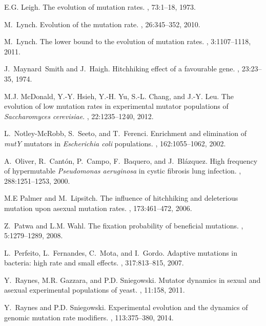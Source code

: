 \documentclass[preprint,12pt,number]{elsarticle}
\begin{document}
\begin{thebibliography}{10}
E.G. Leigh.
\newblock The evolution of mutation rates.
, 73:1--18, 1973.

M.~Lynch.
\newblock Evolution of the mutation rate.
, 26:345--352, 2010.

M.~Lynch.
\newblock The lower bound to the evolution of mutation rates.
, 3:1107--1118, 2011.

J.~Maynard~Smith and J.~Haigh.
\newblock Hitchhiking effect of a favourable gene.
, 23:23--35, 1974.

M.J. McDonald, Y.-Y. Hsieh, Y.-H. Yu, S.-L. Chang, and J.-Y. Leu.
\newblock The evolution of low mutation rates in experimental mutator
  populations of \emph{Saccharomyces cerevisiae}.
, 22:1235--1240, 2012.

L.~Notley-McRobb, S.~Seeto, and T.~Ferenci.
\newblock Enrichment and elimination of \emph{mutY} mutators in
  \emph{Escherichia coli} populations.
, 162:1055--1062, 2002.

A.~Oliver, R.~Cant{\'o}n, P.~Campo, F.~Baquero, and J.~Bl{\'a}zquez.
\newblock High frequency of hypermutable \emph{Pseudomonas aeruginosa} in
  cystic fibrosis lung infection.
, 288:1251--1253, 2000.

M.E Palmer and M.~Lipsitch.
\newblock The influence of hitchhiking and deleterious mutation upon asexual
  mutation rates.
, 173:461--472, 2006.

Z.~Patwa and L.M. Wahl.
\newblock The fixation probability of beneficial mutations.
, 5:1279--1289, 2008.

L.~Perfeito, L.~Fernandes, C.~Mota, and I.~Gordo.
\newblock Adaptive mutations in bacteria: high rate and small effects.
, 317:813--815, 2007.

Y.~Raynes, M.R. Gazzara, and P.D. Sniegowski.
\newblock Mutator dynamics in sexual and asexual experimental populations of
  yeast.
, 11:158, 2011.

Y.~Raynes and P.D. Sniegowski.
\newblock Experimental evolution and the dynamics of genomic mutation rate
  modifiers.
, 113:375--380, 2014.


\end{thebibliography}
\end{document}
